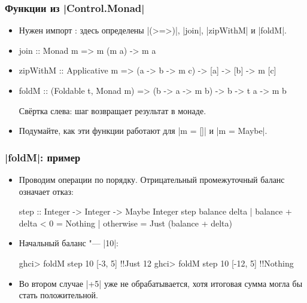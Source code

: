 \documentclass[11pt]{beamer}
\begin{document}
\begin{frame}[fragile]
  \frametitle{Функции из \haskinline|Control.Monad|}
  \begin{itemize}[<+->]
    \item Нужен импорт \href{https://hackage.haskell.org/package/base/docs/Control-Monad.html}{}: здесь определены \haskinline|(>=>)|, \haskinline|join|, \haskinline|zipWithM| и \haskinline|foldM|.
    \item
          \begin{haskell}
            join :: Monad m => m (m a) -> m a
          \end{haskell}
    \item
          \begin{haskell}
            zipWithM :: Applicative m =>
              (a -> b -> m c) -> [a] -> [b] -> m [c]
          \end{haskell}
    \item
          \begin{haskellsmall}
            foldM :: (Foldable t, Monad m) =>
              (b -> a -> m b) -> b -> t a -> m b
          \end{haskellsmall}
          Свёртка слева: шаг возвращает результат в монаде.
    \item Подумайте, как эти функции работают для \haskinline|m = []| и \haskinline|m = Maybe|.
  \end{itemize}
\end{frame}

\begin{frame}[fragile]
  \frametitle{\haskinline|foldM|: пример}
  \begin{itemize}
    \item Проводим операции по порядку. Отрицательный промежуточный баланс означает отказ:
          \begin{haskellsmall}
            step :: Integer -> Integer -> Maybe Integer
            step balance delta
              | balance + delta < 0 = Nothing
              | otherwise = Just (balance + delta)
          \end{haskellsmall}
    \item Начальный баланс "--- \haskinline|10|:
          \begin{haskellsmall}
            ghci> foldM step 10 [-3, 5]
            !\pause!Just 12
            ghci> foldM step 10 [-12, 5]
            !\pause!Nothing
          \end{haskellsmall}
    \item Во втором случае \haskinline|+5| уже не обрабатывается, хотя итоговая сумма могла бы стать положительной.
  \end{itemize}
\end{frame}
\end{document}
